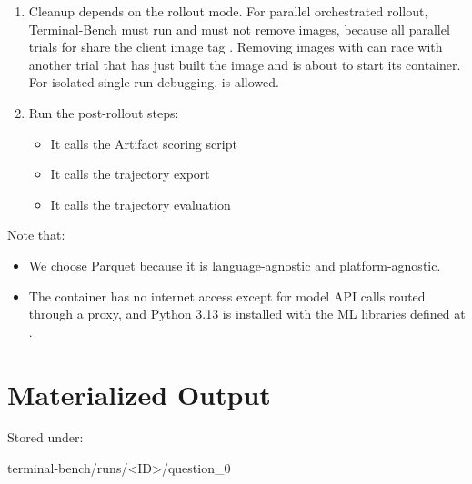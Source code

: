 \documentclass[11pt]{article}
\begin{document}
\begin{enumerate}
\begin{itemize}
  \end{itemize}
  \item Cleanup depends on the rollout mode.
       For parallel orchestrated rollout, Terminal-Bench must run  and must not remove images, because all parallel trials for  share the client image tag . 
       Removing images with  can race with another trial that has just built the image and is about to start its container. 
       For isolated single-run debugging,  is allowed.
  \item Run the post-rollout steps:
  \begin{itemize}
    \item It calls the Artifact scoring script 
    \item It calls the trajectory export 
    \item It calls the trajectory evaluation 
  \end{itemize}
\end{enumerate}
  
Note that:
\begin{itemize}
\item We choose Parquet because it is language-agnostic and platform-agnostic.
\item The container has no internet access except for model API calls routed through a proxy, and Python 3.13 is installed with the ML libraries defined at .
\end{itemize}

\section*{Materialized Output}
\label{sec:agentic-rollout-materialized-output}
Stored under:
\begin{DocCode}
terminal-bench/runs/<ID>/question_0
\end{DocCode}
\end{document}
